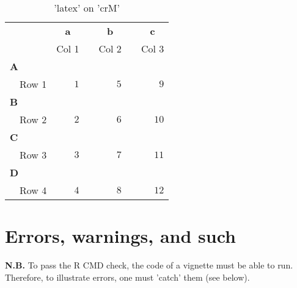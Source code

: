 \documentclass{article}\usepackage[]{graphicx}\usepackage[]{color}
\begin{document}
\begin{table}[!tbp]
\caption{'latex' on 'crM'\label{tab:a2}} 
\begin{center}
\begin{tabular}{lrcrcr}
\hline\hline
\multicolumn{1}{l}{\bfseries }&\multicolumn{1}{c}{\bfseries a}&\multicolumn{1}{c}{\bfseries }&\multicolumn{1}{c}{\bfseries b}&\multicolumn{1}{c}{\bfseries }&\multicolumn{1}{c}{\bfseries c}\tabularnewline
\cline{2-2} \cline{4-4} \cline{6-6}
\multicolumn{1}{l}{}&\multicolumn{1}{c}{Col 1}&\multicolumn{1}{c}{}&\multicolumn{1}{c}{Col 2}&\multicolumn{1}{c}{}&\multicolumn{1}{c}{Col 3}\tabularnewline
\hline
{\bfseries A}&&&&&\tabularnewline
~~Row 1&$1$&&$5$&&$ 9$\tabularnewline
\hline
{\bfseries B}&&&&&\tabularnewline
~~Row 2&$2$&&$6$&&$10$\tabularnewline
\hline
{\bfseries C}&&&&&\tabularnewline
~~Row 3&$3$&&$7$&&$11$\tabularnewline
\hline
{\bfseries D}&&&&&\tabularnewline
~~Row 4&$4$&&$8$&&$12$\tabularnewline
\hline
\end{tabular}\end{center}

\end{table}


\section{Errors, warnings, and such}
\textbf{N.B.} To pass the R CMD check, the code of a vignette must be able to run.
Therefore, to illustrate errors, one must 'catch' them (see below).
\end{document}
